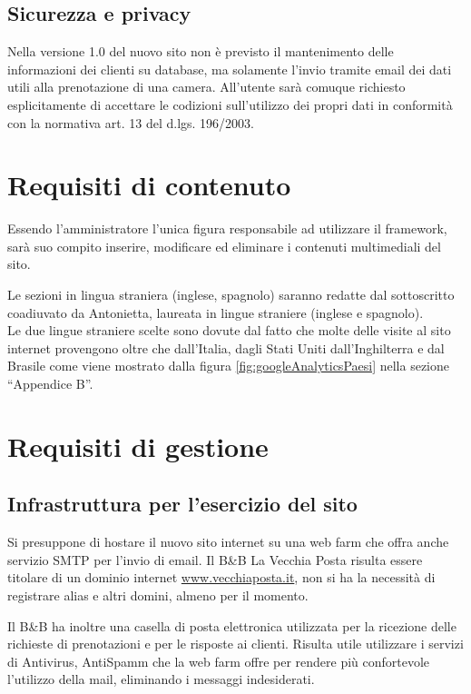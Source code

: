 \documentclass[a4paper,12pt,hidelinks]{report}
\begin{document}
  \subsection{Sicurezza e privacy}
    Nella versione 1.0 del nuovo sito non è previsto il mantenimento delle informazioni dei clienti su database, ma solamente l'invio tramite email dei dati utili alla prenotazione di una camera.
    All'utente sarà comuque richiesto esplicitamente di accettare le codizioni sull'utilizzo dei propri dati in conformità con la normativa art. 13 del d.lgs. 196/2003.

\section{Requisiti di contenuto}
  Essendo l'amministratore l'unica figura responsabile ad utilizzare il framework, sarà suo compito inserire, modificare ed eliminare i contenuti multimediali del sito.
  \par Le sezioni in lingua straniera (inglese, spagnolo) saranno redatte dal sottoscritto coadiuvato da Antonietta, laureata in lingue straniere (inglese e spagnolo).
  \\Le due lingue straniere scelte sono dovute dal fatto che molte delle visite al sito internet provengono oltre che dall'Italia, dagli Stati Uniti dall'Inghilterra e dal Brasile 
  come viene mostrato dalla figura \ref{fig:googleAnalyticsPaesi} nella sezione ``Appendice B''.
\newpage
\section{Requisiti di gestione}

  \subsection{Infrastruttura per l'esercizio del sito}
    Si presuppone di hostare il nuovo sito internet su una web farm che offra anche servizio SMTP per l'invio di email. 
    Il B\&B La Vecchia Posta risulta essere titolare di un dominio internet \url{www.vecchiaposta.it},
    non si ha la necessità di registrare alias e altri domini, almeno per il momento.
    \par Il B\&B ha inoltre una casella di posta elettronica utilizzata per la ricezione delle richieste di prenotazioni e per le risposte ai clienti. 
    Risulta utile utilizzare i servizi di Antivirus, AntiSpamm che la web farm offre per rendere più confortevole l'utilizzo della mail, eliminando i 
    messaggi indesiderati.
    
\end{document}
